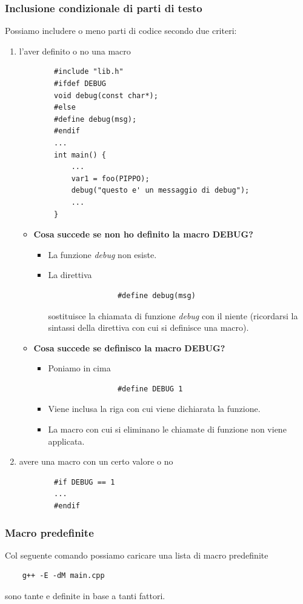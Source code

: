 \subsubsection{Inclusione condizionale di parti di testo} Possiamo includere o meno parti di codice secondo due criteri:
\begin{enumerate}
	\item l'aver definito o no una macro
	\begin{verbatim}
		#include "lib.h"
		#ifdef DEBUG
		void debug(const char*);
		#else
		#define debug(msg);
		#endif
		...
		int main() {
			... 
			var1 = foo(PIPPO);
			debug("questo e' un messaggio di debug");
			...
		}
	\end{verbatim}
	\begin{itemize}
		\item \textbf{Cosa succede se non ho definito la macro DEBUG?}
		\begin{itemize}
			\item La funzione \emph{debug} non esiste.
			\item La direttiva 
			\begin{verbatim}
				#define debug(msg)
			\end{verbatim}
			sostituisce la chiamata di funzione \emph{debug} con il niente (ricordarsi la sintassi della direttiva con cui si definisce una macro).
		\end{itemize}
		\item \textbf{Cosa succede se definisco la macro DEBUG?}
		\begin{itemize}
			\item Poniamo in cima
			\begin{verbatim}
				#define DEBUG 1
			\end{verbatim}
			\item Viene inclusa la riga con cui viene dichiarata la funzione.
			\item La macro con cui si eliminano le chiamate di funzione non viene applicata.
		\end{itemize}
	\end{itemize}
	
	\item avere una macro con un certo valore o no
	\begin{verbatim}
		#if DEBUG == 1
		...
		#endif
	\end{verbatim}
\end{enumerate}
\subsubsection{Macro predefinite}
Col seguente comando possiamo caricare una lista di macro predefinite
\begin{verbatim}
	g++ -E -dM main.cpp
\end{verbatim}
sono tante e definite in base a tanti fattori.
